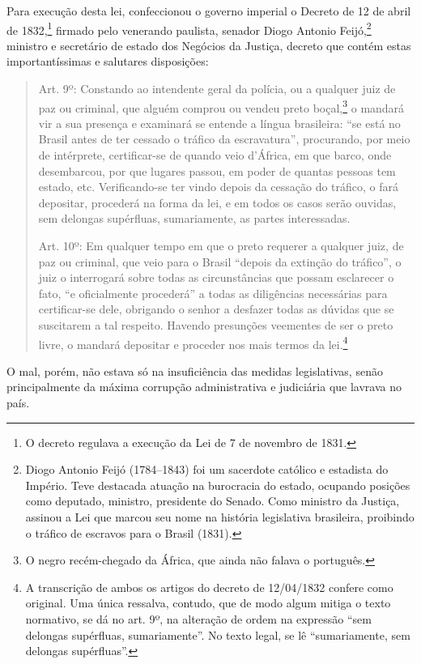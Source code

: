 {Para execução desta lei, confeccionou o governo imperial o Decreto de 12
de abril de 1832,\footnote{O decreto regulava a execução da Lei de 7 de
  novembro de 1831.} firmado pelo venerando paulista, senador Diogo
Antonio Feijó,\footnote{Diogo Antonio Feijó
  (1784--1843) foi um sacerdote católico e estadista do Império. Teve
  destacada atuação na burocracia do estado, ocupando posições como
  deputado, ministro, presidente do Senado. Como ministro da Justiça,
  assinou a Lei que marcou seu nome na história legislativa brasileira,
  proibindo o tráfico de escravos para o Brasil (1831).} ministro e secretário de
estado dos Negócios da Justiça, decreto que contém estas
importantíssimas e salutares disposições:

\begin{quote}
Art. 9º: Constando ao intendente geral da polícia, ou a qualquer juiz
de paz ou criminal, que alguém comprou ou vendeu preto boçal,\footnote{
  O negro recém-chegado da África, que ainda não falava o português.} o
mandará vir a sua presença e examinará se entende a língua brasileira:
``se está no Brasil antes de ter cessado o tráfico da escravatura'',
procurando, por meio de intérprete, certificar-se de quando veio
d'África, em que barco, onde desembarcou, por que lugares passou, em
poder de quantas pessoas tem estado, etc. Verificando-se ter vindo
depois da cessação do tráfico, o fará depositar, procederá na forma da
lei, e em todos os casos serão ouvidas, sem delongas supérfluas,
sumariamente, as partes interessadas.

Art. 10º: Em qualquer tempo em que o preto requerer a qualquer juiz, de
paz ou criminal, que veio para o Brasil ``depois da extinção do tráfico'',
o juiz o interrogará sobre todas as circunstâncias que possam esclarecer
o fato, ``e oficialmente procederá'' a todas as diligências necessárias
para certificar-se dele, obrigando o senhor a desfazer todas as dúvidas
que se suscitarem a tal respeito. Havendo presunções veementes de ser o
preto livre, o mandará depositar e proceder nos mais termos da
lei.\footnote{A transcrição de ambos os artigos do decreto de
  12/04/1832 confere como original. Uma única ressalva, contudo, que de
  modo algum mitiga o texto normativo, se dá no art. 9º, na alteração
  de ordem na expressão ``sem delongas supérfluas, sumariamente''. No
  texto legal, se lê ``sumariamente, sem delongas
  supérfluas''.}
\end{quote}  

O mal, porém, não estava só na insuficiência das medidas legislativas,
senão principalmente da máxima corrupção administrativa e judiciária que
lavrava no país.

}
